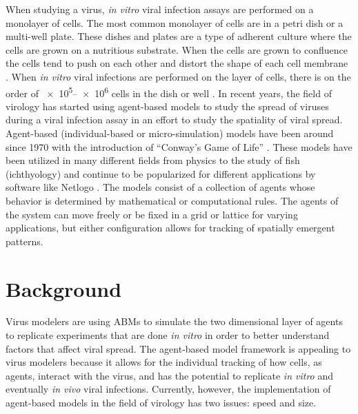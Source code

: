 When studying a virus, \emph{in vitro} viral infection assays are performed on a monolayer of cells. The most common monolayer of cells are in a petri dish or a multi-well plate. These dishes and plates are a type of adherent culture where the cells are grown on a nutritious substrate. When the cells are grown to confluence the cells tend to push on each other and distort the shape of each cell membrane \cite{bruckner_importance_2018}. When \emph{in vitro} viral infections are performed on the layer of cells, there is on the order of \numrange[range-phrase = --]{e5}{e6} cells in the dish or well \cite{Number_of_cells_in_a_dish_noauthor_useful_nodate}. In recent years, the field of virology has started using agent-based models to study the spread of viruses during a viral infection assay \cite{beauchemin_simple_2005,alvarado_cellular-level_2018,wodarz_laws_2014,tong_development_2015,whitman20,goyal16,itakura10,wasik14} in an effort to study the spatiality of viral spread. Agent-based (individual-based or micro-simulation) models have been around since 1970 with the introduction of ``Conway's Game of Life'' \cite{gardner70}. These models have been utilized in many different fields from physics to the study of fish (ichthyology) \cite{owusu20} and continue to be popularized for different applications by software like Netlogo \cite{nogare20,chiacchio14}. The models consist of a collection of agents whose behavior is determined by mathematical or computational rules. The agents of the system can move freely \cite{beauchemin07} or be fixed in a grid or lattice \cite{beauchemin_simple_2005} for varying applications, but either configuration allows for tracking of spatially emergent patterns. 


\section{Background}
Virus modelers are using ABMs to simulate the two dimensional layer of agents to replicate experiments that are done \emph{in vitro} in order to better understand factors that affect viral spread. The agent-based model framework is appealing to virus modelers because it allows for the individual tracking of how cells, as agents, interact with the virus, and has the potential to replicate \emph{in vitro} and eventually \emph{in vivo} viral infections. Currently, however, the implementation of agent-based models in the field of virology has two issues: speed and size. 

